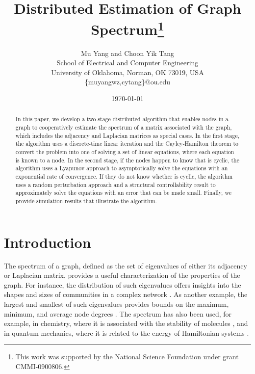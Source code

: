 \documentclass[11pt]{article}
\theoremstyle{plain}
\theoremstyle{definition}
\theoremstyle{remark}
\begin{document}
\title{\LARGE\bf Distributed Estimation of Graph Spectrum\footnote{This work was supported by the National Science Foundation under grant CMMI-0900806.}}
\author{Mu Yang and Choon Yik Tang\\ School of Electrical and Computer Engineering\\ University of Oklahoma, Norman, OK 73019, USA\\ {\sf\{muyangwz,cytang\}@ou.edu}}
\date{\today}
\maketitle

\begin{abstract}
In this paper, we develop a two-stage distributed algorithm that enables nodes in a graph to cooperatively estimate the spectrum of a matrix  associated with the graph, which includes the adjacency and Laplacian matrices as special cases. In the first stage, the algorithm uses a discrete-time linear iteration and the Cayley-Hamilton theorem to convert the problem into one of solving a set of linear equations, where each equation is known to a node. In the second stage, if the nodes happen to know that  is cyclic, the algorithm uses a Lyapunov approach to asymptotically solve the equations with an exponential rate of convergence. If they do not know whether  is cyclic, the algorithm uses a random perturbation approach and a structural controllability result to approximately solve the equations with an error that can be made small. Finally, we provide simulation results that illustrate the algorithm.
\end{abstract}

\section{Introduction}\label{sec:intr}

The spectrum of a graph, defined as the set of eigenvalues of either its adjacency or Laplacian matrix, provides a useful characterization of the properties of the graph. For instance, the distribution of such eigenvalues offers insights into the shapes and sizes of communities in a complex network \cite{Newman10}. As another example, the largest and smallest of such eigenvalues provides bounds on the maximum, minimum, and average node degrees \cite{Chung97}. The spectrum has also been used, for example, in chemistry, where it is associated with the stability of molecules \cite{Chung97}, and in quantum mechanics, where it is related to the energy of Hamiltonian systems \cite{Chung97}.
\end{document}
